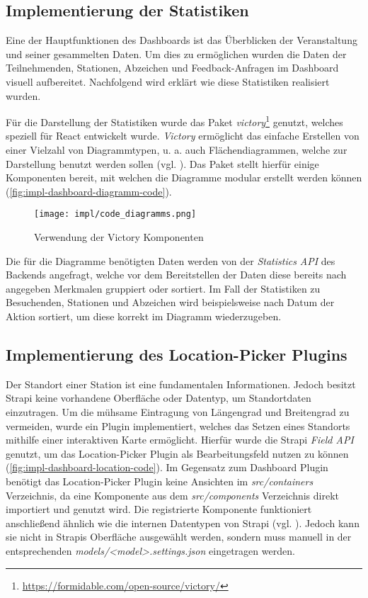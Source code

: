 \subsection{Implementierung der Statistiken}

Eine der Hauptfunktionen des Dashboards ist das Überblicken der Veranstaltung
und seiner gesammelten Daten. Um dies zu ermöglichen wurden die Daten der
Teilnehmenden, Stationen, Abzeichen und Feedback-Anfragen im Dashboard visuell
aufbereitet. Nachfolgend wird erklärt wie diese Statistiken realisiert wurden.

Für die Darstellung der Statistiken wurde das Paket
\textit{victory}\footnote{\url{https://formidable.com/open-source/victory/}}
genutzt, welches speziell für React entwickelt wurde. \textit{Victory}
ermöglicht das einfache Erstellen von einer Vielzahl von Diagrammtypen, u. a.
auch Flächendiagrammen, welche zur Darstellung benutzt werden sollen (vgl.
). Das Paket stellt hierfür einige Komponenten bereit,
mit welchen die Diagramme modular erstellt werden können (\autoref{fig:impl-dashboard-diagramm-code}).

\begin{figure}[htpb]
    \centering
    \texttt{[image: impl/code\_diagramms.png]}
    \caption{Verwendung der Victory Komponenten}
    \label{fig:impl-dashboard-diagramm-code}
\end{figure}

Die für die Diagramme benötigten Daten werden von der \textit{Statistics API}
des Backends angefragt, welche vor dem Bereitstellen der Daten diese bereits
nach angegeben Merkmalen gruppiert oder sortiert. Im Fall der Statistiken zu
Besuchenden, Stationen und Abzeichen wird beispielsweise nach Datum der Aktion
sortiert, um diese korrekt im Diagramm wiederzugeben.

\subsection{Implementierung des Location-Picker Plugins} \label{ssec:impl-dashboard-location-plugin}

Der Standort einer Station ist eine fundamentalen Informationen. Jedoch besitzt
Strapi keine vorhandene Oberfläche oder Datentyp, um Standortdaten einzutragen.
Um die mühsame Eintragung von Längengrad und Breitengrad zu vermeiden, wurde ein
Plugin implementiert, welches das Setzen eines Standorts mithilfe einer
interaktiven Karte ermöglicht. Hierfür wurde die Strapi \textit{Field API}
genutzt, um das Location-Picker Plugin als Bearbeitungsfeld nutzen zu können
(\autoref{fig:impl-dashboard-location-code}). Im Gegensatz zum Dashboard Plugin
benötigt das Location-Picker Plugin keine Ansichten im \textit{src/containers}
Verzeichnis, da eine Komponente aus dem \textit{src/components} Verzeichnis
direkt importiert und genutzt wird. Die registrierte Komponente funktioniert
anschließend ähnlich wie die internen Datentypen von Strapi (vgl.
). Jedoch kann sie nicht in Strapis
Oberfläche ausgewählt werden, sondern muss manuell in der entsprechenden
\textit{models/<model>.settings.json} eingetragen werden.

